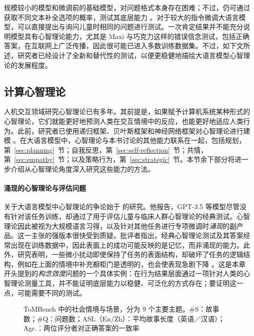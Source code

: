 规模较小的模型和微调前的基础模型，对问题格式本身存在困难；不过，仍可通过获取不同文本补全选项的概率，测试其底层能力 \citep{kouwenhoven2026traces}。对于较大的指令微调大语言模型，可以直接提出与询问儿童时相同的问题进行测试。一次肯定结果并不能充分说明模型具有心智理论能力，尤其是 Maxi 与巧克力这样的错误信念测试，包括正确答案，在互联网上广泛传播，因此很可能已进入多数训练数据集。不过，如下文所述，研究者已经设计了全新和替代性的测试，以便更稳健地描绘大语言模型心智理论的发展程度。

\subsection{计算心智理论}
人机交互领域研究心智理论已有多年。其前提是，如果赋予计算机系统某种形式的心智理论，它们就能更好地预测人类在交互情境中的反应，也能更好地适应人类行为。此前，研究者已使用递归框架、贝叶斯框架和神经网络框架对心智理论进行建模 \citep{deweerd2017negotiating, baker2011bayesian, pmlr-v80-rabinowitz18a}。在大语言模型中，心智理论与本书讨论的其他能力联系在一起，包括规划，第~\ref{sec:planning}~节；自我反思，第~\ref{sec:self-reflection}~节；共情，第~\ref{sec:empathy}~节；以及策略行为，第~\ref{sec:strategic}~节。本节余下部分将进一步介绍从心智理论角度深入研究这些能力的方法。

\paragraph{涌现的心智理论与评估问题}
关于大语言模型中心智理论的争论始于 \citet{kosinski2023theory, kosinski2024evaluating} 的研究。他报告，GPT-3.5 等模型尽管没有针对该任务训练，却通过了用于评估儿童与临床人群心智理论的经典测试。心智理论因此被视为大规模语言习得，以及针对其他任务进行专项微调时\emph{涌现}的副产品。这一主张的强版本很快受到质疑。批评者指出，经典心智理论测试及其答案经常出现在训练数据中，因此表面上的成功可能反映的是记忆，而非涌现的能力。此外，研究表明，一些微小扰动即使保持了任务的表面结构，却破坏了任务的逻辑结构，例如在上面的情境中补充橱柜门是透明的，也会使表现急剧下降 \citep{ullman2023large, shapira2023clever, kim-etal-2023-fantom}。这是本章开头提到的\emph{构念效度}问题的一个具体实例：在行为结果层面通过一项针对人类的心智理论测量工具，并不能证明底层能力以稳健、可泛化的方式存在；要证明这一点，可能需要不同的测试。

\begin{figure}
  \begin{center}
    
    \caption{ToMBench 中的社会情境与场景，分为 9 个主要主题。\#S：故事数；\#Q：问题数；ASL（En/Zh）：平均故事长度（英语／汉语）；Agr.：两位评分者对正确答案的一致率 \citep{chen2024tombenchbenchmarkingtheorymind}}\label{fig:tombench}
  \end{center}
\end{figure}

